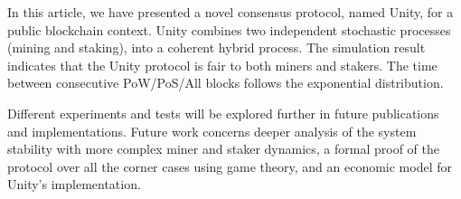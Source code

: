 \documentclass[a4paper]{article}
\begin{document}
In this article, we have presented a novel consensus protocol, named Unity, for a public blockchain context. Unity combines two independent stochastic processes (mining and staking), into a coherent hybrid process. The simulation result indicates that the Unity protocol is fair to both miners and stakers. The time between consecutive PoW/PoS/All blocks follows the exponential distribution.

Different experiments and tests will be explored further in future publications and implementations. Future work concerns deeper analysis of the system stability with more complex miner and staker dynamics, a formal proof of the protocol over all the corner cases using game theory, and an economic model for Unity's implementation.

\clearpage
\begingroup
\raggedright


\endgroup
\end{document}
